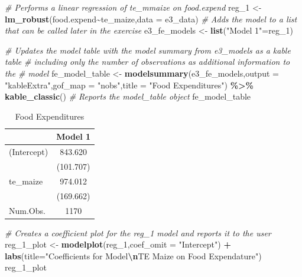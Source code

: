 \documentclass[
]{article}
\newenvironment{Shaded}{\begin{snugshade}}{\end{snugshade}}
\newcommand{\AttributeTok}[1]{\textcolor[rgb]{0.13,0.29,0.53}{#1}}
\newcommand{\CommentTok}[1]{\textcolor[rgb]{0.56,0.35,0.01}{\textit{#1}}}
\newcommand{\FunctionTok}[1]{\textcolor[rgb]{0.13,0.29,0.53}{\textbf{#1}}}
\newcommand{\NormalTok}[1]{#1}
\newcommand{\OtherTok}[1]{\textcolor[rgb]{0.56,0.35,0.01}{#1}}
\newcommand{\SpecialCharTok}[1]{\textcolor[rgb]{0.81,0.36,0.00}{\textbf{#1}}}
\newcommand{\StringTok}[1]{\textcolor[rgb]{0.31,0.60,0.02}{#1}}
\begin{document}
\begin{Shaded}
\begin{Highlighting}[]
\CommentTok{\# Performs a linear regression of te\_mmaize on food.expend}
\NormalTok{reg\_1 }\OtherTok{\textless{}{-}} \FunctionTok{lm\_robust}\NormalTok{(food.expend}\SpecialCharTok{\textasciitilde{}}\NormalTok{te\_maize,}\AttributeTok{data =}\NormalTok{ e3\_data)}
\CommentTok{\# Adds the model to a list that can be called later in the exercise}
\NormalTok{e3\_fe\_models }\OtherTok{\textless{}{-}} \FunctionTok{list}\NormalTok{(}\StringTok{"Model 1"}\OtherTok{=}\NormalTok{reg\_1)}

\CommentTok{\# Updates the model table with the model summary from e3\_models as a kable table}
\CommentTok{\# including only the number of observations as additional information to the }
\CommentTok{\# model}
\NormalTok{fe\_model\_table }\OtherTok{\textless{}{-}} \FunctionTok{modelsummary}\NormalTok{(e3\_fe\_models,}\AttributeTok{output =} \StringTok{"kableExtra"}\NormalTok{,}\AttributeTok{gof\_map =} \StringTok{"nobs"}\NormalTok{,}\AttributeTok{title =} \StringTok{"Food Expenditures"}\NormalTok{) }\SpecialCharTok{\%\textgreater{}\%} \FunctionTok{kable\_classic}\NormalTok{()}
\CommentTok{\# Reports the model\_table object}
\NormalTok{fe\_model\_table}
\end{Highlighting}
\end{Shaded}

\begin{table}

\caption{\label{tab:unnamed-chunk-5}Food Expenditures}
\centering
\begin{tabular}[t]{lc}
\toprule
  & Model 1\\
\midrule
(Intercept) & \num{843.620}\\
 & (\num{101.707})\\
te\_maize & \num{974.012}\\
 & (\num{169.662})\\
\midrule
Num.Obs. & \num{1170}\\
\bottomrule
\end{tabular}
\end{table}

\begin{Shaded}
\begin{Highlighting}[]
\CommentTok{\# Creates a coefficient plot for the reg\_1 model and reports it to the user}
\NormalTok{reg\_1\_plot }\OtherTok{\textless{}{-}} \FunctionTok{modelplot}\NormalTok{(reg\_1,}\AttributeTok{coef\_omit =} \StringTok{"Intercept"}\NormalTok{) }\SpecialCharTok{+} \FunctionTok{labs}\NormalTok{(}\AttributeTok{title=}\StringTok{"Coefficients for Model}\SpecialCharTok{\textbackslash{}n}\StringTok{TE Maize on Food Expendature"}\NormalTok{)}
\NormalTok{reg\_1\_plot}
\end{Highlighting}
\end{Shaded}
\end{document}
